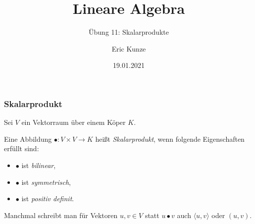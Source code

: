 \documentclass{beamer}
\begin{document}
	\title{Lineare Algebra}
	\subtitle{Übung 11: Skalarprodukte}
	\author{Eric Kunze}
	\date{19.01.2021}

	\maketitle


\begin{frame} \frametitle{Skalarprodukt}
    Sei $V$ ein Vektorraum über einem Köper $K$.

    Eine Abbildung $\bullet : V \times V \to K$ heißt \emph{Skalarprodukt}, wenn folgende Eigenschaften erfüllt sind:
    \begin{itemize}
        \item $\bullet$ ist \emph{bilinear},
        \item $\bullet$ ist \emph{symmetrisch},
        \item $\bullet$ ist \emph{positiv definit}.
    \end{itemize}

    Manchmal schreibt man für Vektoren $u,v \in V$ statt $u \bullet v$ auch $\langle u , v \rangle$ oder $(u,v)$.
\end{frame}
\end{document}
